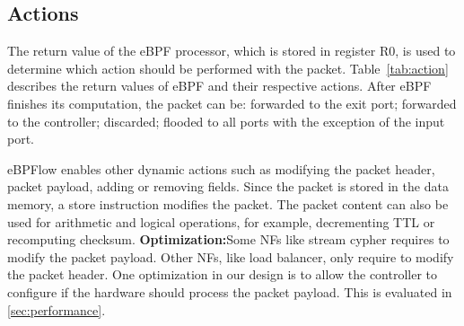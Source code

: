 \subsection{Actions}
\label{secsec:actions}

\begin{table}[tb]
\centering
\caption{Action performed on the packets.}
\label{tab:action}
\end{table}


The return value of the eBPF processor, which is stored in register R0, is used to determine which action should be performed with the packet. Table~\ref{tab:action} describes the return values of eBPF and their respective actions. After eBPF finishes its computation, the packet can be: forwarded to the exit port; forwarded to the controller; discarded; flooded to all ports with the exception of the input port.


eBPFlow enables other dynamic actions such as modifying the packet header, packet payload, adding or removing fields.
Since the packet is stored in the data memory, a store instruction modifies the packet. The packet content can also be used for arithmetic and logical operations, for example, decrementing TTL or recomputing checksum.
\textbf{Optimization:}Some NFs like stream cypher requires to modify the packet payload. Other NFs, like load balancer, only require to modify the packet header. 
One optimization in our design is to allow the controller to configure if the hardware should process the packet payload. This is evaluated in \textsection\ref{sec:performance}.